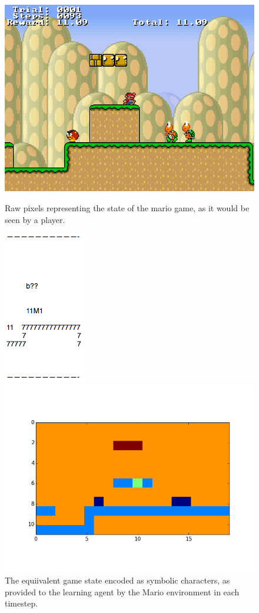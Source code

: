 \documentclass{article}
\begin{document}
 \begin{figure}
 \begin{center}
\includegraphics[scale=0.35]{mario_screenshot.png}
\caption{Raw pixels representing the state of the mario game, as it would be seen by a player.}
\includegraphics[scale=0.42]{game_state.png}
\caption{The equiivalent game state encoded as symbolic characters, as provided to the learning agent by the Mario environment in each timestep.}
\includegraphics[scale=0.43]{encoded_state.png}

\end{center}
\end{figure}
\end{document}
